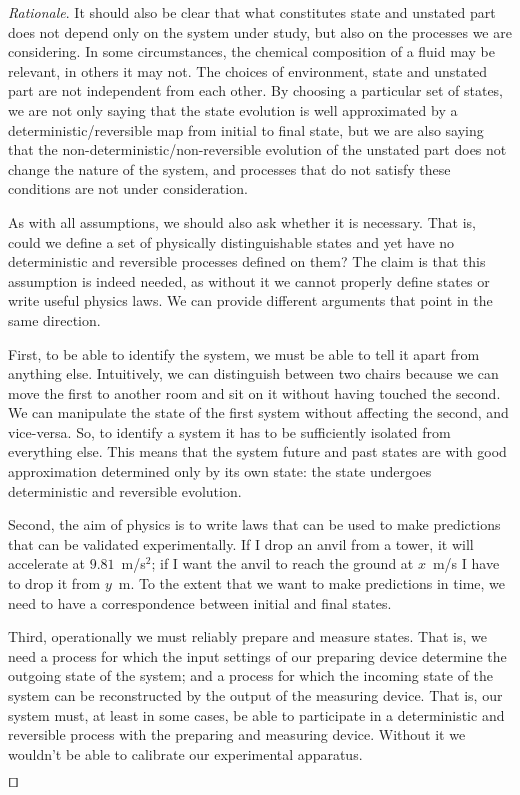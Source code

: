 \documentclass[smallextended]{svjour3}
\numberwithin{equation}{section}
\newenvironment{rationale}{\emph{Rationale}.}{\hfill\(\qed\)}
\begin{document}
\begin{rationale}
It should also be clear that what constitutes state and unstated part does not depend only on the system under study, but also on the processes we are considering. In some circumstances, the chemical composition of a fluid may be relevant, in others it may not. The choices of environment, state and unstated part are not independent from each other. By choosing a particular set of states, we are not only saying that the state evolution is well approximated by a deterministic/reversible map from initial to final state, but we are also saying that the non-deterministic/non-reversible evolution of the unstated part does not change the nature of the system, and processes that do not satisfy these conditions are not under consideration.

As with all assumptions, we should also ask whether it is necessary. That is, could we define a set of physically distinguishable states and yet have no deterministic and reversible processes defined on them? The claim is that this assumption is indeed needed, as without it we cannot properly define states or write useful physics laws. We can provide different arguments that point in the same direction.

First, to be able to identify the system, we must be able to tell it apart from anything else. Intuitively, we can distinguish between two chairs because we can move the first to another room and sit on it without having touched the second. We can manipulate the state of the first system without affecting the second, and vice-versa. So, to identify a system it has to be sufficiently isolated from everything else. This means that the system future and past states are with good approximation determined only by its own state: the state undergoes deterministic and reversible evolution.

Second, the aim of physics is to write laws that can be used to make predictions that can be validated experimentally. If I drop an anvil from a tower, it will accelerate at $9.81$~m/s$^2$; if I want the anvil to reach the ground at $x$~m/s I have to drop it from $y$~m. To the extent that we want to make predictions in time, we need to have a correspondence between initial and final states.

Third, operationally we must reliably prepare and measure states. That is, we need a process for which the input settings of our preparing device determine the outgoing state of the system; and a process for which the incoming state of the system can be reconstructed by the output of the measuring device. That is, our system must, at least in some cases, be able to participate in a deterministic and reversible process with the preparing and measuring device. Without it we wouldn't be able to calibrate our experimental apparatus.


\end{rationale}
\end{document}
